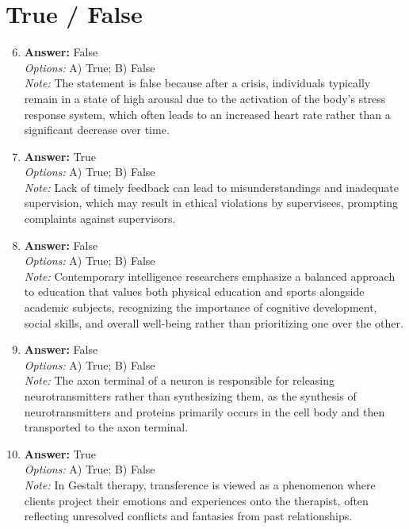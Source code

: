 \documentclass[12pt]{article}
\begin{document}
\section*{True / False}
\begin{enumerate}[label=\arabic*.]
\setcounter{enumi}{5}
\item \textbf{Answer:} False
\\ \textit{Options:} A) True; B) False
\\ \textit{Note:} The statement is false because after a crisis, individuals typically remain in a state of high arousal due to the activation of the body's stress response system, which often leads to an increased heart rate rather than a significant decrease over time.
\item \textbf{Answer:} True
\\ \textit{Options:} A) True; B) False
\\ \textit{Note:} Lack of timely feedback can lead to misunderstandings and inadequate supervision, which may result in ethical violations by supervisees, prompting complaints against supervisors.
\item \textbf{Answer:} False
\\ \textit{Options:} A) True; B) False
\\ \textit{Note:} Contemporary intelligence researchers emphasize a balanced approach to education that values both physical education and sports alongside academic subjects, recognizing the importance of cognitive development, social skills, and overall well-being rather than prioritizing one over the other.
\item \textbf{Answer:} False
\\ \textit{Options:} A) True; B) False
\\ \textit{Note:} The axon terminal of a neuron is responsible for releasing neurotransmitters rather than synthesizing them, as the synthesis of neurotransmitters and proteins primarily occurs in the cell body and then transported to the axon terminal.
\item \textbf{Answer:} True
\\ \textit{Options:} A) True; B) False
\\ \textit{Note:} In Gestalt therapy, transference is viewed as a phenomenon where clients project their emotions and experiences onto the therapist, often reflecting unresolved conflicts and fantasies from past relationships.
\end{enumerate}
\end{document}
